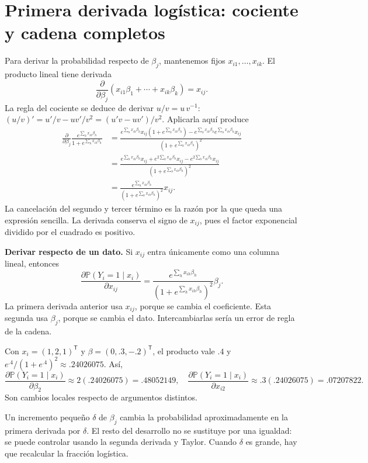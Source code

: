 \documentclass[11pt,a4paper]{article}
\newcommand{\Prob}{\mathbb P}
\newcommand{\T}{^{\mathsf T}}
\begin{document}
\clearpage
\section{Primera derivada logística: cociente y cadena completos}\label{logit5}
Para derivar la probabilidad respecto de $\beta_j$, mantenemos fijos
$x_{i1},\ldots,x_{ik}$. El producto lineal tiene derivada
\[
\frac{\partial}{\partial\beta_j}
(x_{i1}\beta_1+\cdots+x_{ik}\beta_k)=x_{ij}.
\]
La regla del cociente se deduce de derivar $u/v=u\,v^{-1}$:
$(u/v)'=u'/v-uv'/v^2=(u'v-uv')/v^2$.
Aplicarla aquí produce
\[
\begin{aligned}
\frac{\partial}{\partial\beta_j}
\frac{e^{\sum_hx_{ih}\beta_h}}{1+e^{\sum_hx_{ih}\beta_h}}
&=\frac{
e^{\sum_hx_{ih}\beta_h}x_{ij}(1+e^{\sum_hx_{ih}\beta_h})
-e^{\sum_hx_{ih}\beta_h}e^{\sum_hx_{ih}\beta_h}x_{ij}}
{(1+e^{\sum_hx_{ih}\beta_h})^2}\\
&=\frac{e^{\sum_hx_{ih}\beta_h}x_{ij}
+e^{2\sum_hx_{ih}\beta_h}x_{ij}
-e^{2\sum_hx_{ih}\beta_h}x_{ij}}
{(1+e^{\sum_hx_{ih}\beta_h})^2}\\
&=\boxed{\frac{e^{\sum_hx_{ih}\beta_h}}
{(1+e^{\sum_hx_{ih}\beta_h})^2}x_{ij}}.
\end{aligned}
\]
La cancelación del segundo y tercer término es la razón por la que
queda una expresión sencilla. La derivada conserva el signo de $x_{ij}$,
pues el factor exponencial dividido por el cuadrado es positivo.

\textbf{Derivar respecto de un dato.}
Si $x_{ij}$ entra únicamente como una columna lineal, entonces
\[
\frac{\partial\Prob(Y_i=1\mid x_i)}{\partial x_{ij}}
=\frac{e^{\sum_hx_{ih}\beta_h}}
{(1+e^{\sum_hx_{ih}\beta_h})^2}\beta_j.
\]
La primera derivada anterior usa $x_{ij}$, porque se cambia el
coeficiente. Esta segunda usa $\beta_j$, porque se cambia el dato.
Intercambiarlas sería un error de regla de la cadena.

\begin{ejemplo}
Con $x_i=(1,2,1)\T$ y $\beta=(0,.3,-.2)\T$, el producto vale $.4$ y
$e^{.4}/(1+e^{.4})^2\approx.24026075$. Así,
\[
\frac{\partial\Prob(Y_i=1\mid x_i)}{\partial\beta_2}
\approx2(.24026075)=.48052149,
\quad
\frac{\partial\Prob(Y_i=1\mid x_i)}{\partial x_{i2}}
\approx.3(.24026075)=.07207822.
\]
Son cambios locales respecto de argumentos distintos.
\end{ejemplo}
Un incremento pequeño $\delta$ de $\beta_j$ cambia la probabilidad
aproximadamente en la primera derivada por $\delta$.
El resto del desarrollo no se sustituye por una igualdad: se puede
controlar usando la segunda derivada y Taylor.
Cuando $\delta$ es grande, hay que recalcular la fracción logística.
\end{document}
